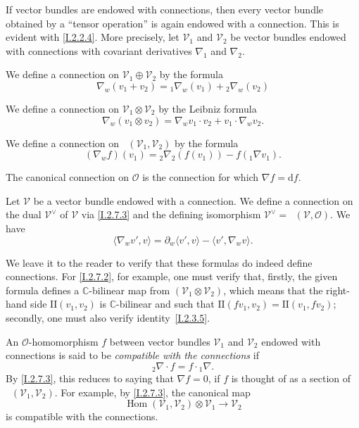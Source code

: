 \documentclass{report}
\theoremstyle{plain}
\theoremstyle{definition}
\newenvironment{env}[1]
    {\renewcommand\theinnercustomenv{#1}\innercustomenv}
    {\endinnercustomenv}
\newcommand{\sh}{\mathscr}
\newcommand{\dd}{\mathrm{d}}
\newcommand{\II}{\mathrm{II}}
\DeclareMathOperator{\Hom}{Hom}
\DeclareMathOperator{\shHom}{\underline{Hom}}
\newcommand{\oldpage}[1]{\marginpar{\footnotesize$\Big\vert$ \textit{p.~#1}}}
\begin{document}
\begin{env}{2.7}
\label{I.2.7}
  If vector bundles are endowed with connections, then every vector bundle obtained by a ``tensor operation'' is again endowed with a connection.
  This is evident with \cref{I.2.2.4}.
  More precisely, let $\sh{V}_1$ and $\sh{V}_2$ be vector bundles endowed with connections with covariant derivatives $\nabla_1$ and $\nabla_2$.

  \begin{env}{2.7.1}
  \label{I.2.7.1}
    We define a connection on $\sh{V}_1\oplus\sh{V}_2$ by the formula
    \[
      \nabla_w(v_1+v_2) = {}_1\!\nabla_w(v_1) + {}_2\!\nabla_w(v_2)
    \]
  \end{env}

  \begin{env}{2.7.2}
  \label{I.2.7.2}
    We define a connection on $\sh{V}_1\otimes\sh{V}_2$ by the Leibniz formula
    \[
      \nabla_w(v_1\otimes v_2) = \nabla_w v_1\cdot v_2 + v_1\cdot\nabla_w v_2.
    \]
  \end{env}

  \begin{env}{2.7.3}
  \label{I.2.7.3}
    We define a connection on $\shHom(\sh{V}_1,\sh{V}_2)$ by the formula
    \[
      (\nabla_w f)(v_1) = {}_2\!\nabla_2(f(v_1)) - f({}_1\!\nabla v_1).
    \]
  \end{env}

  The canonical connection on $\sh{O}$ is the connection for which $\nabla f=\dd f$.
  
  Let $\sh{V}$ be a vector bundle endowed with a connection.
  \begin{env}{2.7.4}
  \label{I.2.7.4}
    We define a connection on the dual $\sh{V}^\vee$ of $\sh{V}$ via \cref{I.2.7.3} and the defining isomorphism $\sh{V}^\vee = \shHom(\sh{V},\sh{O})$.
    We have
    \[
      \langle \nabla_w v',v \rangle = \partial_w\langle v',v \rangle - \langle v',\nabla_w v \rangle.
    \]
  \end{env}

  We leave it to the reader to verify that these formulas do indeed define connections.
  For \cref{I.2.7.2}, for example, one must verify that, firstly, the given formula defines a $\mathbb{C}$-bilinear map from $(\sh{V}_1\otimes\sh{V}_2)$, which means that the right-hand side $\II(v_1,v_2)$ is $\mathbb{C}$-bilinear and such that $\II(fv_1,v_2)=\II(v_1,fv_2)$;
  secondly, one must also verify identity~\cref{I.2.3.5}.
\end{env}

\begin{env}{2.8}
\label{I.2.8}
  An $\sh{O}$-homomorphism $f$ between vector bundles $\sh{V}_1$ and $\sh{V}_2$ endowed with connections
\oldpage{9}
  is said to be \emph{compatible with the connections} if
  \[
    {}_2\!\nabla\cdot f = f\cdot{}_1\!\nabla.
  \]
  By \cref{I.2.7.3}, this reduces to saying that $\nabla f=0$, if $f$ is thought of as a section of $\shHom(\sh{V}_1,\sh{V}_2)$.
  For example, by \cref{I.2.7.3}, the canonical map
  \[
    \Hom(\sh{V}_1,\sh{V}_2)\otimes\sh{V}_1 \to \sh{V}_2
  \]
  is compatible with the connections.
\end{env}
\end{document}
